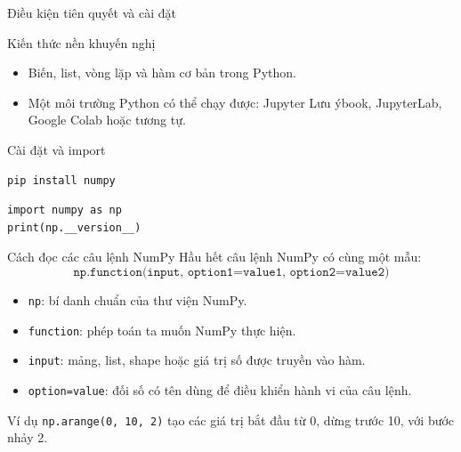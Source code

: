 \documentclass[aspectratio=169,11pt]{beamer}
\begin{document}
\begin{frame}[fragile]{Điều kiện tiên quyết và cài đặt}
\begin{block}{Kiến thức nền khuyến nghị}
\begin{itemize}
  \item Biến, list, vòng lặp và hàm cơ bản trong Python.
  \item Một môi trường Python có thể chạy được: Jupyter Lưu ýbook, JupyterLab, Google Colab hoặc tương tự.
\end{itemize}
\end{block}
\begin{block}{Cài đặt và import}
\begin{lstlisting}[style=py]
pip install numpy
\end{lstlisting}
\begin{lstlisting}[style=py]
import numpy as np
print(np.__version__)
\end{lstlisting}
\end{block}
\end{frame}


\begin{frame}{Cách đọc các câu lệnh NumPy}
\small
Hầu hết câu lệnh NumPy có cùng một mẫu:
\[
\texttt{np.function(input, option1=value1, option2=value2)}
\]
\begin{itemize}
  \item \texttt{np}: bí danh chuẩn của thư viện NumPy.
  \item \texttt{function}: phép toán ta muốn NumPy thực hiện.
  \item \texttt{input}: mảng, list, shape hoặc giá trị số được truyền vào hàm.
  \item \texttt{option=value}: đối số có tên dùng để điều khiển hành vi của câu lệnh.
\end{itemize}
\begin{block}{Ví dụ}
\texttt{np.arange(0, 10, 2)} tạo các giá trị bắt đầu từ 0, dừng trước 10, với bước nhảy 2.
\end{block}
\end{frame}
\end{document}
